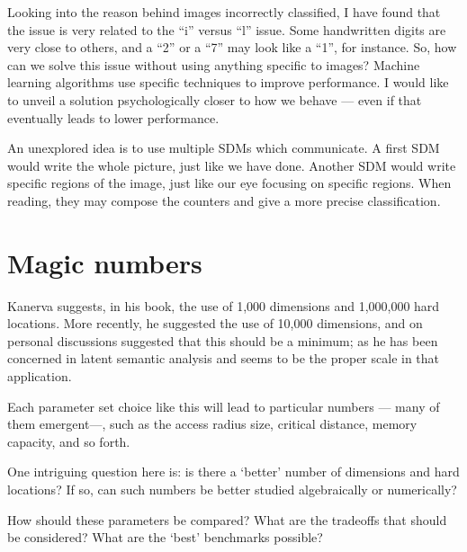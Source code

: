 Looking into the reason behind images incorrectly classified, I have found that the issue is very related to the ``i'' versus ``l'' issue. Some handwritten digits are very close to others, and a ``2'' or a ``7'' may look like a ``1'', for instance. So, how can we solve this issue without using anything specific to images?  Machine learning algorithms use specific techniques to improve performance. I would like to unveil a solution psychologically closer to how we behave --- even if that eventually leads to lower performance.

An unexplored idea is to use multiple SDMs which communicate. A first SDM would write the whole picture, just like we have done. Another SDM would write specific regions of the image, just like our eye focusing on specific regions. When reading, they may compose the counters and give a more precise classification.







\section{Magic numbers}

Kanerva suggests, in his book, the use of 1,000 dimensions and 1,000,000 hard locations.  More recently, he suggested the use of 10,000 dimensions, and on personal discussions suggested that this should be a minimum; as he has been concerned in latent semantic analysis and seems to be the proper scale in that application.

Each parameter set choice like this will lead to particular numbers --- many of them emergent---, such as the access radius size, critical distance, memory capacity, and so forth.

One intriguing question here is:  is there a `better' number of dimensions and hard locations?  If so, can such numbers be better studied algebraically or numerically?

How should these parameters be compared?  What are the tradeoffs that should be considered?  What are the `best' benchmarks possible?




